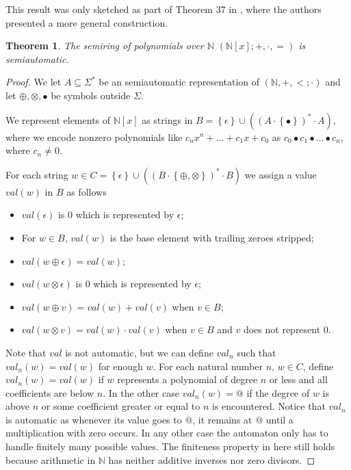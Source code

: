 \documentclass[british,a4paper,11pt,abstract=on]{scrreprt}
\newtheorem{theorem}{Theorem}
\theoremstyle{definition}
\theoremstyle{remark}
\newcommand{\set}[1]{\left\{ #1 \right\}}
\newcommand{\N}{\mathbb{N}}
\begin{document}
This result was only sketched as part of Theorem 37 in \autocite{semiauto}, where the authors presented a more general construction.
\begin{theorem} \label{natural polynomials}
    The semiring of polynomials over \(\N\) \((\N[x];+,\cdot,=)\) is semiautomatic.
\end{theorem}
\begin{proof}
    We let \(A \subseteq \Sigma^*\) be an semiautomatic representation of \((\N, +, <;\cdot)\)
    and let \(\oplus, \otimes, \bullet\) be symbols outside \(\Sigma\).

    We represent elements of \(\N[x]\) as strings in \(B = \set{\epsilon}\cup \left(\left(A\cdot \set{\bullet}\right)^*\cdot A\right)\),
    where we encode nonzero polynomials like
    \(c_nx^n + \dots + c_1x + c_0\) as \(c_0\bullet c_1\bullet\dots\bullet c_n\),
    where \(c_n \ne 0\).

    For each string \(w \in C = \set{\epsilon}\cup\left( \left(B\cdot \set{\oplus,\otimes} \right)^*\cdot B \right)\)
    we assign a value \(val(w)\) in \(B\) as follows
    \begin{itemize}
        \item \(val(\epsilon)\) is \(0\) which is represented by \(\epsilon\);
        \item For \(w \in B\),
            \(val(w)\) is the base element with trailing zeroes stripped;
        \item \(val(w\oplus\epsilon) = val(w)\);
        \item \(val(w\otimes\epsilon)\) is \(0\) which is represented by \(\epsilon\);
        \item \(val(w\oplus v) = val(w) + val(v)\) when \(v\in B\);
        \item \(val(w\otimes v) = val(w)\cdot val(v)\) when \(v\in B\) and \(v\) does not represent \(0\).
    \end{itemize}
    Note that \(val\) is not automatic, but we can define \(val_n\) such that \(val_n(w) = val(w)\) for enough \(w\).
    For each natural number \(n\), \(w\in C\), define
    \(val_n(w) = val(w)\) if \(w\) represents a polynomial of degree \(n\) or less
    and all coefficients are below \(n\).
    In the other case \(val_n(w) = @\) if the degree of \(w\) is above \(n\) or
    some coefficient greater or equal to \(n\) is encountered.
    Notice that \(val_n\) is automatic as whenever its value goes to \(@\), it remains at \(@\) until a multiplication with zero occurs.
    In any other case the automaton only has to handle finitely many possible values.
    The finiteness property in here still holds because arithmetic in \(\N\) has neither additive inverses nor zero divisors.


\end{proof}
\end{document}
